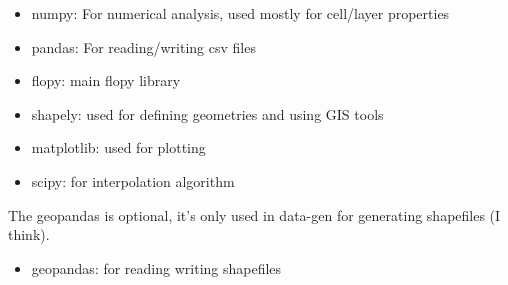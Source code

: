 \documentclass[titlepage,12pt]{unisubmission}
\begin{document}
\begin{itemize}
\item numpy: For numerical analysis, used mostly for cell/layer properties
\item pandas: For reading/writing csv files
\item flopy: main flopy library
\item shapely: used for defining geometries and using GIS tools
\item matplotlib: used for plotting
\item scipy: for interpolation algorithm
\end{itemize}

The geopandas is optional, it's only used in data-gen for generating shapefiles (I think).
\begin{itemize}
\item geopandas: for reading writing shapefiles
\end{itemize}
\end{document}
